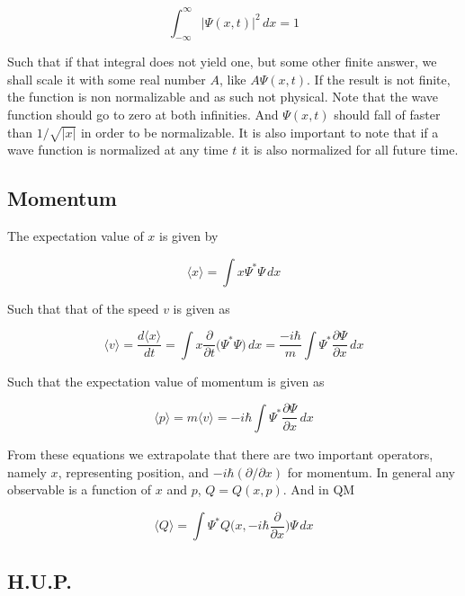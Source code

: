 \documentclass[a4paper]{article}
\begin{document}
\begin{equation}
    \int_{-\infty}^{\infty}|\Psi(x,t)|^2\,dx=1
\end{equation}

Such that if that integral does not yield one, but some other finite answer, we shall scale it with some real number $A$, like $A\Psi(x,t)$. If the result is not finite, the function is non normalizable and as such not physical. Note that the wave function should go to zero at both infinities. And $\Psi(x,t)$ should fall of faster than $1/\sqrt{|x|}$ in order to be normalizable. It is also important to note that if a wave function is normalized at any time $t$ it is also normalized for all future time.

\subsection{Momentum}

The expectation value of $x$ is given by

\begin{equation}
    \langle x \rangle = \int x\Psi^{*}\Psi\,dx
\end{equation}

Such that that of the speed $v$ is given as

\begin{equation}
    \langle v \rangle = \frac{d\langle x\rangle}{dt}=\int x\frac{\partial}{\partial t}\big(\Psi^{*}\Psi\big)\,dx=\frac{-i\hbar}{m}\int\Psi^{*}\frac{\partial\Psi}{\partial x}\,dx
\end{equation}

Such that the expectation value of momentum is given as

\begin{equation}
    \langle p \rangle = m\langle v \rangle = -i\hbar\int\Psi^{*}\frac{\partial\Psi}{\partial x}\,dx
\end{equation}

From these equations we extrapolate that there are two important operators, namely $x$, representing position, and $-i\hbar(\partial/\partial x)$ for momentum. In general any observable is a function of $x$ and $p$, $Q=Q(x, p)$. And in QM

\begin{equation}
    \langle Q \rangle = \int\Psi^{*}Q\bigg(x, -i\hbar\frac{\partial}{\partial x}\bigg)\Psi\,dx
\end{equation}

\subsection{H.U.P.}
\end{document}
